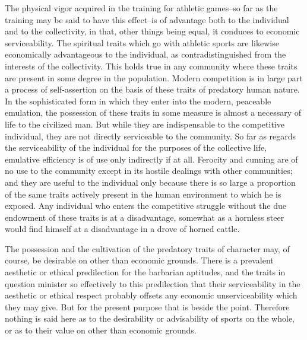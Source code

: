 \documentclass[12pt]{report}
\begin{document}
The physical vigor acquired in the training for athletic games--so far
as the training may be said to have this effect--is of advantage both
to the individual and to the collectivity, in that, other things being
equal, it conduces to economic serviceability. The spiritual traits
which go with athletic sports are likewise economically advantageous
to the individual, as contradistinguished from the interests of the
collectivity. This holds true in any community where these traits are
present in some degree in the population. Modern competition is in
large part a process of self-assertion on the basis of these traits of
predatory human nature. In the sophisticated form in which they enter
into the modern, peaceable emulation, the possession of these traits
in some measure is almost a necessary of life to the civilized man. But
while they are indispensable to the competitive individual, they are
not directly serviceable to the community. So far as regards the
serviceability of the individual for the purposes of the collective
life, emulative efficiency is of use only indirectly if at all. Ferocity
and cunning are of no use to the community except in its hostile
dealings with other communities; and they are useful to the individual
only because there is so large a proportion of the same traits actively
present in the human environment to which he is exposed. Any individual
who enters the competitive struggle without the due endowment of these
traits is at a disadvantage, somewhat as a hornless steer would find
himself at a disadvantage in a drove of horned cattle.

The possession and the cultivation of the predatory traits of character
may, of course, be desirable on other than economic grounds. There is a
prevalent aesthetic or ethical predilection for the barbarian aptitudes,
and the traits in question minister so effectively to this predilection
that their serviceability in the aesthetic or ethical respect probably
offsets any economic unserviceability which they may give. But for the
present purpose that is beside the point. Therefore nothing is said here
as to the desirability or advisability of sports on the whole, or as to
their value on other than economic grounds.
\end{document}
